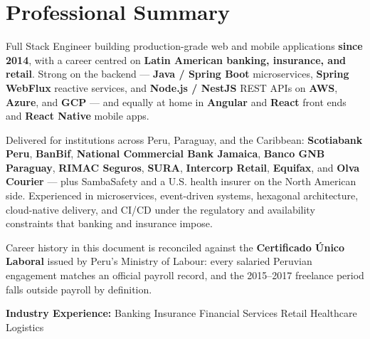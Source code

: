 
\section{Professional Summary}

Full Stack Engineer building production-grade web and mobile applications \textbf{since 2014},
with a career centred on \textbf{Latin American banking, insurance, and retail}. Strong on the
backend --- \textbf{Java / Spring Boot} microservices, \textbf{Spring WebFlux} reactive services,
and \textbf{Node.js / NestJS} REST APIs on \textbf{AWS}, \textbf{Azure}, and \textbf{GCP} --- and
equally at home in \textbf{Angular} and \textbf{React} front ends and \textbf{React Native} mobile
apps.

\vspace{3pt}

Delivered for institutions across Peru, Paraguay, and the Caribbean: \textbf{Scotiabank Peru},
\textbf{BanBif}, \textbf{National Commercial Bank Jamaica}, \textbf{Banco GNB Paraguay},
\textbf{RIMAC Seguros}, \textbf{SURA}, \textbf{Intercorp Retail}, \textbf{Equifax}, and
\textbf{Olva Courier} --- plus SambaSafety and a U.S. health insurer on the North American side. Experienced in microservices, event-driven systems, hexagonal architecture,
cloud-native delivery, and CI/CD under the regulatory and availability constraints that banking and
insurance impose.

\vspace{3pt}

Career history in this document is reconciled against the \textbf{Certificado Único Laboral} issued
by Peru's Ministry of Labour: every salaried Peruvian engagement matches an official payroll record,
and the 2015--2017 freelance period falls outside payroll by definition.

\vspace{4pt}
{\small\color{cvMuted}%
  \textbf{Industry Experience:}\enspace%
  Banking\enspace\textbar\enspace
  Insurance\enspace\textbar\enspace
  Financial Services\enspace\textbar\enspace
  Retail\enspace\textbar\enspace
  Healthcare\enspace\textbar\enspace
  Logistics%
}
